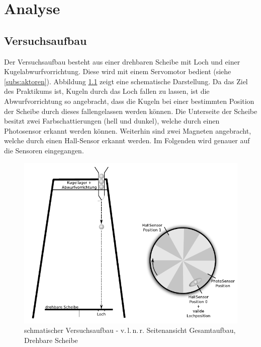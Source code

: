 \chapter{Analyse}\label{k_analyse}
\section{Versuchsaufbau}\label{s_versuchsaufbau}

Der Versuchsaufbau besteht aus einer drehbaren Scheibe mit Loch und einer Kugelabwurfvorrichtung.
Diese wird mit einem Servomotor bedient (siehe \cref{subs:aktoren}).
Abbildung \ref{img:versuchsaufbau} zeigt eine schematische Darstellung.
Da das Ziel des Praktikums ist, Kugeln durch das Loch fallen zu lassen, ist die Abwurfvorrichtung so angebracht, dass die Kugeln bei einer bestimmten Position der Scheibe durch dieses fallengelassen werden können.
Die Unterseite der Scheibe besitzt zwei Farbschattierungen (hell und dunkel), welche durch einen Photosensor erkannt werden können.
Weiterhin sind zwei Magneten angebracht, welche durch einen Hall-Sensor erkannt werden.
Im Folgenden wird genauer auf die Sensoren eingegangen.

\begin{figure}[h] \centering
	\includegraphics[width=\textwidth]{images/aufbau.pdf}
	\caption{schmatischer Versuchsaufbau - v.\,l.\,n.\,r. Seitenansicht Gesamtaufbau, Drehbare Scheibe}
	\label{img:versuchsaufbau}
\end{figure}

